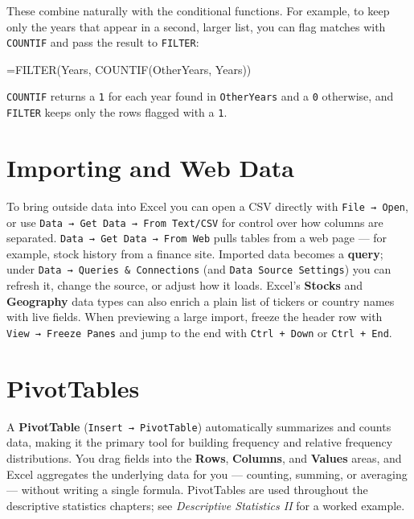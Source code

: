\documentclass[
  11pt,
  letterpaper,
  DIV=11,
  numbers=noendperiod,
  oneside,
  open=any]{scrreprt}
\newenvironment{Shaded}{\begin{snugshade}}{\end{snugshade}}
\newcommand{\NormalTok}[1]{\textcolor[rgb]{0.00,0.23,0.31}{#1}}
\begin{document}
These combine naturally with the conditional functions. For example, to
keep only the years that appear in a second, larger list, you can flag
matches with \texttt{COUNTIF} and pass the result to \texttt{FILTER}:

\begin{Shaded}
\begin{Highlighting}[]
\NormalTok{=FILTER(Years, COUNTIF(OtherYears, Years))}
\end{Highlighting}
\end{Shaded}

\texttt{COUNTIF} returns a \texttt{1} for each year found in
\texttt{OtherYears} and a \texttt{0} otherwise, and \texttt{FILTER}
keeps only the rows flagged with a \texttt{1}.

\section{Importing and Web Data}\label{importing-and-web-data}

To bring outside data into Excel you can open a CSV directly with
\texttt{File\ →\ Open}, or use
\texttt{Data\ →\ Get\ Data\ →\ From\ Text/CSV} for control over how
columns are separated. \texttt{Data\ →\ Get\ Data\ →\ From\ Web} pulls
tables from a web page --- for example, stock history from a finance
site. Imported data becomes a \textbf{query}; under
\texttt{Data\ →\ Queries\ \&\ Connections} (and
\texttt{Data\ Source\ Settings}) you can refresh it, change the source,
or adjust how it loads. Excel's \textbf{Stocks} and \textbf{Geography}
data types can also enrich a plain list of tickers or country names with
live fields. When previewing a large import, freeze the header row with
\texttt{View\ →\ Freeze\ Panes} and jump to the end with
\texttt{Ctrl\ +\ Down} or \texttt{Ctrl\ +\ End}.

\section{PivotTables}\label{pivottables}

A \textbf{PivotTable} (\texttt{Insert\ →\ PivotTable}) automatically
summarizes and counts data, making it the primary tool for building
frequency and relative frequency distributions. You drag fields into the
\textbf{Rows}, \textbf{Columns}, and \textbf{Values} areas, and Excel
aggregates the underlying data for you --- counting, summing, or
averaging --- without writing a single formula. PivotTables are used
throughout the descriptive statistics chapters; see \emph{Descriptive
Statistics II} for a worked example.
\end{document}
